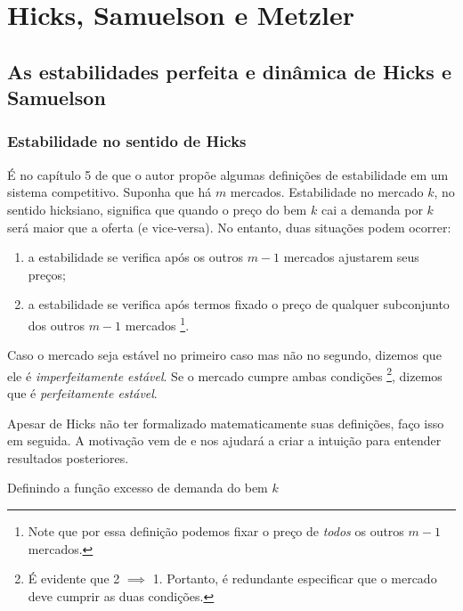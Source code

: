 \documentclass[
	12pt,				%
	openright,			%
	twoside,			%
	a4paper,			%
	english,			%
	french,				%
	spanish,			%
	brazil				%
	]{abntex2}
\begin{document}
\part{Hicks, Samuelson e Metzler}


\chapter{As estabilidades perfeita e dinâmica de Hicks e Samuelson} \label{hickssamuelson}

\section{Estabilidade no sentido de Hicks}

É no capítulo 5 de  que o autor propõe algumas definições
de estabilidade em um sistema competitivo. Suponha que há $m$ mercados.
Estabilidade no mercado $k$, no sentido hicksiano, significa que quando o preço
do bem $k$ cai a demanda por $k$ será maior que a oferta (e vice-versa).
No entanto, duas situações podem ocorrer:

\begin{enumerate}
	\item a estabilidade se verifica após os outros $m - 1$ mercados ajustarem seus
	preços;
	\item a estabilidade se verifica após termos fixado o preço de qualquer subconjunto
	dos outros $m-1$ mercados \footnote{Note que por essa definição podemos fixar o preço de \textit{todos} os outros $m-1$ mercados.}.
\end{enumerate}

Caso o mercado seja estável no primeiro caso mas não no segundo, dizemos que ele
é \textit{imperfeitamente estável}. Se o mercado cumpre ambas condições
\footnote{É evidente que 2 $\implies$ 1. Portanto, é redundante especificar que o mercado
deve cumprir as duas condições.}, dizemos que é \textit{perfeitamente estável}.

Apesar de Hicks não ter formalizado matematicamente suas definições, faço isso
em seguida. A motivação vem de  e nos ajudará a
criar a intuição para entender resultados posteriores.

Definindo a função excesso de demanda do bem $k$
\end{document}
